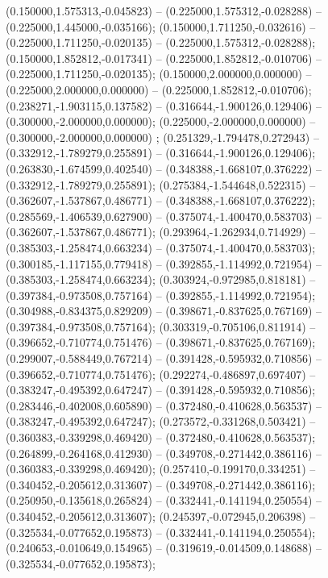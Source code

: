  (0.150000,1.575313,-0.045823) -- (0.225000,1.575312,-0.028288) -- (0.225000,1.445000,-0.035166);
 (0.150000,1.711250,-0.032616) -- (0.225000,1.711250,-0.020135) -- (0.225000,1.575312,-0.028288);
 (0.150000,1.852812,-0.017341) -- (0.225000,1.852812,-0.010706) -- (0.225000,1.711250,-0.020135);
 (0.150000,2.000000,0.000000) -- (0.225000,2.000000,0.000000) -- (0.225000,1.852812,-0.010706);
 (0.238271,-1.903115,0.137582) -- (0.316644,-1.900126,0.129406) -- (0.300000,-2.000000,0.000000);
 (0.225000,-2.000000,0.000000) -- (0.300000,-2.000000,0.000000) ;
 (0.251329,-1.794478,0.272943) -- (0.332912,-1.789279,0.255891) -- (0.316644,-1.900126,0.129406);
 (0.263830,-1.674599,0.402540) -- (0.348388,-1.668107,0.376222) -- (0.332912,-1.789279,0.255891);
 (0.275384,-1.544648,0.522315) -- (0.362607,-1.537867,0.486771) -- (0.348388,-1.668107,0.376222);
 (0.285569,-1.406539,0.627900) -- (0.375074,-1.400470,0.583703) -- (0.362607,-1.537867,0.486771);
 (0.293964,-1.262934,0.714929) -- (0.385303,-1.258474,0.663234) -- (0.375074,-1.400470,0.583703);
 (0.300185,-1.117155,0.779418) -- (0.392855,-1.114992,0.721954) -- (0.385303,-1.258474,0.663234);
 (0.303924,-0.972985,0.818181) -- (0.397384,-0.973508,0.757164) -- (0.392855,-1.114992,0.721954);
 (0.304988,-0.834375,0.829209) -- (0.398671,-0.837625,0.767169) -- (0.397384,-0.973508,0.757164);
 (0.303319,-0.705106,0.811914) -- (0.396652,-0.710774,0.751476) -- (0.398671,-0.837625,0.767169);
 (0.299007,-0.588449,0.767214) -- (0.391428,-0.595932,0.710856) -- (0.396652,-0.710774,0.751476);
 (0.292274,-0.486897,0.697407) -- (0.383247,-0.495392,0.647247) -- (0.391428,-0.595932,0.710856);
 (0.283446,-0.402008,0.605890) -- (0.372480,-0.410628,0.563537) -- (0.383247,-0.495392,0.647247);
 (0.273572,-0.331268,0.503421) -- (0.360383,-0.339298,0.469420) -- (0.372480,-0.410628,0.563537);
 (0.264899,-0.264168,0.412930) -- (0.349708,-0.271442,0.386116) -- (0.360383,-0.339298,0.469420);
 (0.257410,-0.199170,0.334251) -- (0.340452,-0.205612,0.313607) -- (0.349708,-0.271442,0.386116);
 (0.250950,-0.135618,0.265824) -- (0.332441,-0.141194,0.250554) -- (0.340452,-0.205612,0.313607);
 (0.245397,-0.072945,0.206398) -- (0.325534,-0.077652,0.195873) -- (0.332441,-0.141194,0.250554);
 (0.240653,-0.010649,0.154965) -- (0.319619,-0.014509,0.148688) -- (0.325534,-0.077652,0.195873);
